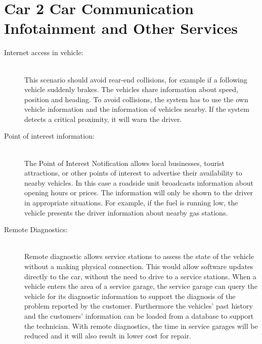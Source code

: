 \section{Car 2 Car Communication Infotainment and Other Services}
\label{sec:C2COtherServices}
\begin{description}
  \item[Internet access in vehicle:] \hfill \\ This scenario should avoid rear-end collisions, for example if a following vehicle suddenly brakes. The vehicles share information about speed, position and heading. To avoid collisions, the system has to use the own vehicle information and the information of vehicles nearby. If the system detects a critical proximity, it will warn the driver.
  \item[Point of interest information:] \hfill \\ The Point of Interest Notification allows local businesses, tourist attractions, or other points of interest to advertise their availability to nearby vehicles. In this case a roadside unit broadcasts information about opening hours or prices. The information will only be shown to the driver in appropriate situations. For example, if the fuel is running low, the vehicle presents the driver information about nearby gas stations.
  \item[Remote Diagnostics:] \hfill \\ Remote diagnostic allows service stations to assess the state of the vehicle without a making physical connection. This would allow software updates directly to the car, without the need to drive to a service stations. When a vehicle enters the area of a service garage, the 
service garage can query the vehicle for its diagnostic information to support the diagnosis of the problem reported by the customer. Furthermore the vehicles' past history and the customers' information can be loaded from a database to support the technician. With remote diagnostics, the time in service garages will be reduced and it will also result in lower cost for repair. 

\end{description}	